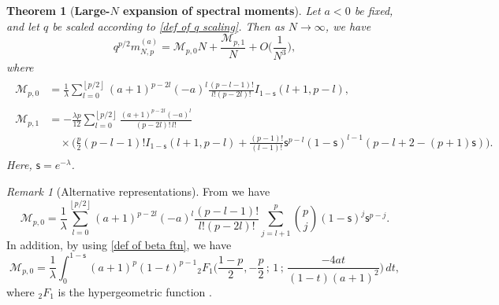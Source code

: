 \documentclass{amsart}
\newcommand{\floor}[1]{\left\lfloor#1\right\rfloor}
\theoremstyle{plain}
\newtheorem{thm}{Theorem}[section]
\theoremstyle{remark}
\newtheorem{rem}{Remark}
\numberwithin{equation}{section}
\begin{document}
\begin{thm}[\textbf{Large-$N$ expansion of spectral moments}] \label{Thm_genus expansion}
    Let $a < 0$ be fixed, and let $q$ be scaled according to \eqref{def of q scaling}.
 Then as $N\rightarrow\infty$, we have
    \begin{equation}\label{eqn:genus expansion}
      q^{ p/2} m_{N,p}^{ (a) }=\mathcal{M}_{p,0}N+\frac{\mathcal{M}_{p,1}}{N}+O\big(\frac{1}{N^3}\big),
    \end{equation}
    where  
    \begin{align}
    \begin{split}
     \label{def of mathcal Mp0}
        \mathcal{M}_{p,0}
       & =\frac{1}{\lambda}\sum_{l=0}^{\floor{p/2}}(a+1)^{p-2l}(-a)^{l}\frac{(p-l-1)!}{l!(p-2l)!}I_{1-\mathsf{s} }(l+1,p-l),
    \end{split}
    \\
     \begin{split}\label{def of mathcal Mp1}
    \mathcal{M}_{p,1} &=-\frac{\lambda p}{12}
        \sum_{l=0}^{\floor{p/2}}\frac{(a+1)^{p-2l}(-a)^{l}}{(p-2l)! \, l!}
        \\
        &\quad \times \bigg( {\frac{p}{2}(p-l-1)!}I_{1-\mathsf{s}  }(l+1,p-l)
        +\frac{(p-1)!}{(l-1)!}  \mathsf{s}^{p-l} (1-\mathsf{s}  )^{l-1}(p-l+2-(p+1) \mathsf{s} )\bigg).     
    \end{split}
    \end{align}
Here, $\mathsf{s}=e^{-\lambda}$. 
\end{thm}
 


 



\begin{rem}[Alternative representations]
    From \cite[Eq.~(8.17.5)]{NIST} we have
    \begin{equation} \label{def of Mp0 v2}
        \mathcal{M}_{p,0}
        =\frac{1}{\lambda}\sum_{l=0}^{\floor{p/2}}(a+1)^{p-2l}(-a)^{l}\frac{(p-l-1)!}{l!(p-2l)!}\sum_{j=l+1}^{p}\binom{p}{j}(1- \mathsf{s}  )^{j} \mathsf{s}^{p-j}. 
    \end{equation}
    In addition, by using \eqref{def of beta ftn}, we have 
    \begin{equation} \label{def of Mp0 v3}
       \mathcal{M}_{p,0}= \frac{1}{\lambda}\int_{0}^{1-\mathsf{s} } (a+1)^{p}(1-t)^{p-1} {{}_2F_{1}}\Big(\frac{1-p}{2},-\frac{p}{2}\, ; \, 1 \, ; \, \frac{-4at}{(1-t)(a+1)^2}\Big)\, dt, 
    \end{equation}
    where ${}_2F_1$ is the hypergeometric function \cite[Chapter 15]{NIST}. 
\end{rem}
\end{document}
